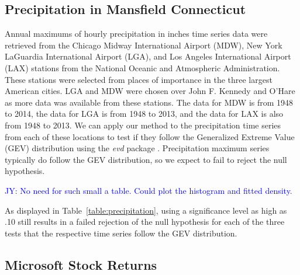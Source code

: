 \documentclass[12pt, titlepage, letterpaper]{article}
\newcommand{\jy}[1]{\textcolor{blue}{JY: #1}}
\newcommand{\mc}[1]{\textcolor{green}{MC: (#1)}}
\begin{document}
{\subsection{Precipitation in Mansfield Connecticut}
\label{sec:precipitation}
Annual maximums of hourly precipitation in inches time series data were 
retrieved 
from the Chicago Midway International Airport (MDW), New York LaGuardia 
International 
Airport (LGA),
and Los Angeles International Airport (LAX) stations from the 
National Oceanic and Atmospheric Administration. These stations were selected 
from places of importance in the three largest American cities. LGA and
MDW were chosen over John F. Kennedy and O'Hare as more data was available
from these stations. The data for MDW is from
1948 to 2014, the data for LGA is from 1948 to 2013, and the
data for LAX is also from 1948 to 2013. We can apply our method to
the precipitation time series from each of these locations to test if they
follow the
Generalized Extreme Value (GEV) distribution using the \textsl{evd} 
package \citep{evd}. Precipitation maximum series 
typically do follow the GEV distribution, so we expect to fail to reject the
null hypothesis.

\jy{No need for such small a table. Could plot the histogram and fitted density.}



As displayed in Table~\ref{table:precipitation}, using a significance level as 
high as .10 still results in a failed rejection
of the null hypothesis for each of the three tests that the respective 
time series follow the GEV distribution.

\subsection{Microsoft Stock Returns}
\label{sec:microsoft}


}
\end{document}
